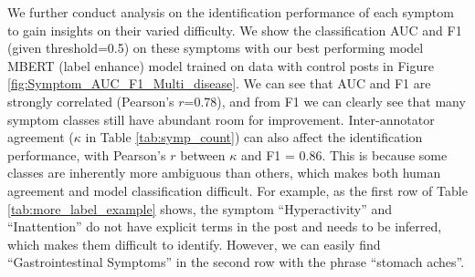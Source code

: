 We further conduct analysis on the identification performance of each symptom to gain insights on their varied difficulty. We show the classification AUC and F1 (given threshold=0.5) on these symptoms with our best performing model MBERT (label enhance) model trained on data with control posts in Figure \ref{fig:Symptom_AUC_F1_Multi_disease}. We can see that AUC and F1 are strongly correlated (Pearson's $r$=0.78), and from F1 we can clearly see that many symptom classes still have abundant room for improvement. Inter-annotator agreement ($\kappa$ in Table \ref{tab:symp_count}) can also affect the identification performance, with Pearson's $r$ between $\kappa$ and F1 = 0.86. This is because some classes are inherently more ambiguous than others, which makes both human agreement and model classification difficult. For example, as the first row of Table \ref{tab:more_label_example} shows, the symptom ``Hyperactivity'' and ``Inattention'' do not have explicit terms in the post and needs to be inferred, which makes them difficult to identify. However, we can easily find ``Gastrointestinal Symptoms'' in the second row with the phrase ``stomach aches''. 